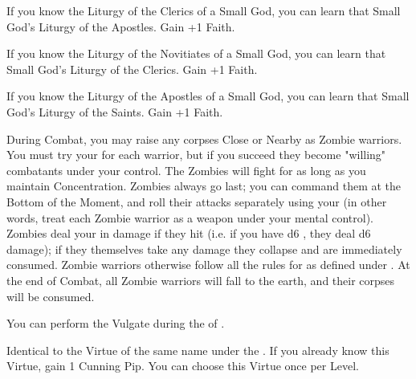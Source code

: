 \begin{multicols*}{2}

If you know the Liturgy of the Clerics of a Small God, you can learn that Small God's Liturgy of the Apostles. Gain +1 \MAX Faith.


If you know the Liturgy of the Novitiates of a Small God, you can learn that Small God's Liturgy of the Clerics. Gain +1 \MAX Faith.



If you know the Liturgy of the Apostles of a Small God, you can learn that Small God's Liturgy of the Saints. Gain +1 \MAX Faith.

\newpage


During Combat, you may raise any corpses Close or Nearby as Zombie warriors. You must try your \JUJU for each warrior, but if you succeed they become "willing" combatants under your control. The Zombies will fight for as long as you maintain Concentration. Zombies always go last; you can command them at the Bottom of the Moment, and roll their attacks separately using your \FOC (in other words, treat each Zombie warrior as a \FOC weapon under your mental control). Zombies deal your \JUJU in damage if they hit (i.e. if you have d6 \JUJU, they deal d6 damage); if they themselves take any damage they collapse and are immediately consumed. Zombie warriors otherwise follow all the rules for  as defined under .  At the end of Combat, all Zombie warriors will fall to the earth, and their corpses will be consumed. 


You can perform the  Vulgate during the  of . 



Identical to the Virtue of the same name under the . If you already know this Virtue, gain 1 Cunning Pip. You can choose this Virtue once per Level.




\end{multicols*}
